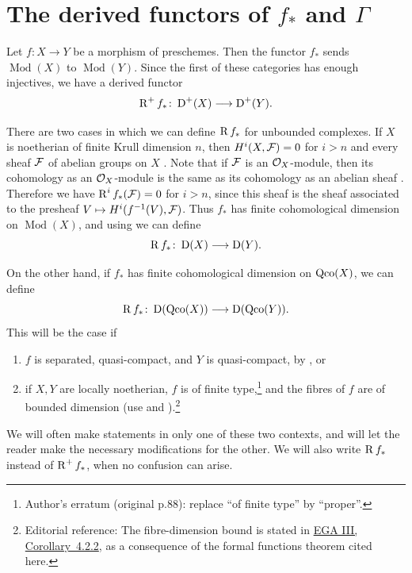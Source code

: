 \section{The derived functors of $f_*$ and $\Gamma$}\label{sec:2.2}

Let $f\colon X\to Y$ be a morphism of preschemes. Then the functor $f_*$ sends $\operatorname{Mod}(X)$ to $\operatorname{Mod}(Y)$. Since the first of these categories has enough injectives, we have a derived functor
\[
\operatorname{R}^+f_*\colon \operatorname{D}^+(X) \longrightarrow \operatorname{D}^+(Y).
\]

There are two cases in which we can define $\operatorname{R} f_*$ for unbounded complexes. If $X$ is noetherian of finite Krull dimension $n$, then $H^i(X,\mathcal{F})=0$ for $i>n$ and every sheaf $\mathcal{F}$ of abelian groups on $X$ \cite[.5]{T}. Note that if $\mathcal{F}$ is an $\mathcal{O}_X$-module, then its cohomology as an $\mathcal{O}_X$-module is the same as its cohomology as an abelian sheaf \cite[\nopp $0_{\mathrm{III}}$, 12.1.1]{EGA}. Therefore we have $\operatorname{R}^if_*(\mathcal{F})=0$ for $i>n$, since this sheaf is the sheaf associated to the presheaf $V\mapsto H^i(f^{-1}(V),\mathcal{F})$. Thus $f_*$ has finite cohomological dimension on $\operatorname{Mod}(X)$, and using  we can define
\[
\operatorname{R} f_*\colon \operatorname{D}(X) \longrightarrow \operatorname{D}(Y).
\]

On the other hand, if $f_*$ has finite cohomological dimension on $\operatorname{Qco}(X)$, we can define
\[
\operatorname{R} f_*\colon \operatorname{D}(\operatorname{Qco}(X)) \longrightarrow \operatorname{D}(\operatorname{Qco}(Y)).
\]
This will be the case if
\begin{enumerate}
\item[a)] $f$ is separated, quasi-compact, and $Y$ is quasi-compact, by \cite[\nopp III,~1.4.12]{EGA}, or
\item[b)] if $X,Y$ are locally noetherian, $f$ is of finite type,\footnote{Author's erratum (original p.88): replace ``of finite type'' by ``proper''.} and the fibres of $f$ are of bounded dimension (use \cite[\nopp III,~4.1.5]{EGA} and \cite[.5]{T}).\footnote{Editorial reference: The fibre-dimension bound is stated in \href{https://www.numdam.org/item/PMIHES_1961__11__5_0.pdf\#page=127}{EGA III, Corollary~4.2.2}, as a consequence of the formal functions theorem cited here.}
\end{enumerate}

We will often make statements in only one of these two contexts, and will let the reader make the necessary modifications for the other. We will also write $\operatorname{R} f_*$ instead of $\operatorname{R}^+f_*$, when no confusion can arise.


